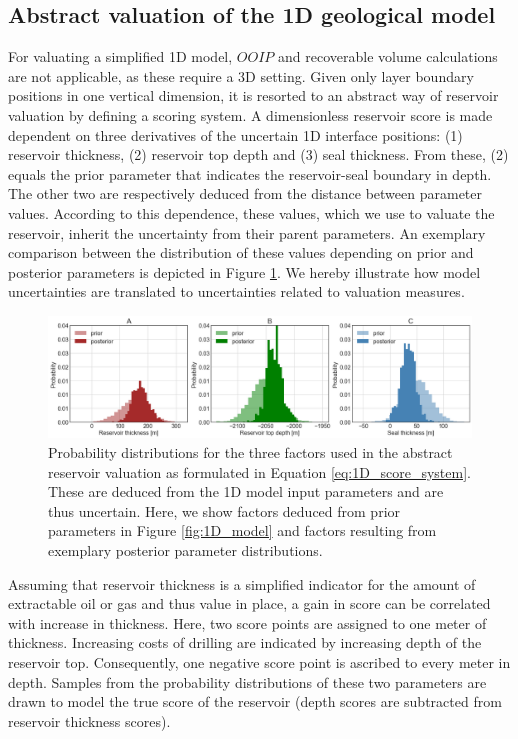 	        \subsection{Abstract valuation of the 1D geological model}\label{sec:1D_score_system}
	        For valuating a simplified 1D model, $OOIP$ and recoverable volume calculations are not applicable, as these require a 3D setting. Given only layer boundary positions in one vertical dimension, it is resorted to an abstract way of reservoir valuation by defining a scoring system. A dimensionless reservoir score is made dependent on three derivatives of the uncertain 1D interface positions: (1) reservoir thickness, (2) reservoir top depth and (3) seal thickness. From these, (2) equals the prior parameter that indicates the reservoir-seal boundary in depth. The other two are respectively deduced from the distance between parameter values. According to this dependence, these values, which we use to valuate the reservoir, inherit the uncertainty from their parent parameters. An exemplary comparison between the distribution of these values depending on prior and posterior parameters is depicted in Figure \ref{fig:3_parameters}. We hereby illustrate how model uncertainties are translated to uncertainties related to valuation measures.\\
	        \begin{figure}[h]
	        	\centering
	        	\includegraphics[width=1\textwidth]{Figures/3_parameters.png}
	        	\caption{Probability distributions for the three factors used in the abstract reservoir valuation as formulated in Equation \ref{eq:1D_score_system}. These are deduced from the 1D model input parameters and are thus uncertain. Here, we show factors deduced from prior parameters in Figure \ref{fig:1D_model} and factors resulting from exemplary posterior parameter distributions.}\label{fig:3_parameters}
	        \end{figure}
	        Assuming that reservoir thickness is a simplified indicator for the amount of extractable oil or gas and thus value in place, a gain in score can be correlated with increase in thickness. Here, two score points are assigned to one meter of thickness. Increasing costs of drilling are indicated by increasing depth of the reservoir top. Consequently, one negative score point is ascribed to every meter in depth. Samples from the probability distributions of these two parameters are drawn to model the true score of the reservoir (depth scores are subtracted from reservoir thickness scores).

